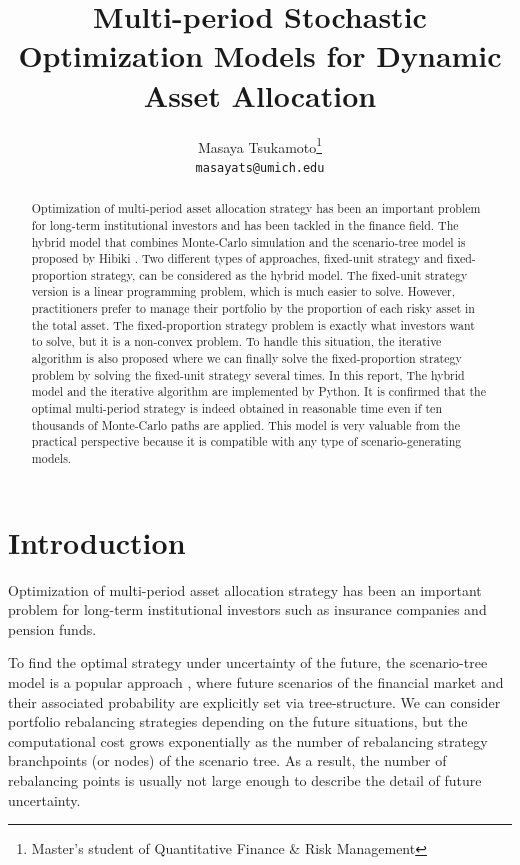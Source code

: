 \documentclass[11t]{article}
\title{\large{Multi-period Stochastic Optimization Models for Dynamic Asset Allocation}}
\author{
    Masaya Tsukamoto\thanks{Master's student of Quantitative Finance \& Risk Management} \\
    \texttt{masayats@umich.edu}
}
\date{}
\begin{document}
\maketitle

\begin{abstract}

Optimization of multi-period asset allocation strategy has been an important problem for long-term institutional investors and has been tackled in the finance field. The hybrid model that combines Monte-Carlo simulation and the scenario-tree model is proposed by Hibiki \cite{hybrid}. Two different types of approaches, fixed-unit strategy and fixed-proportion strategy, can be considered as the hybrid model. The fixed-unit strategy version is a linear programming problem, which is much easier to solve. However, practitioners prefer to manage their portfolio by the proportion of each risky asset in the total asset.  The fixed-proportion strategy problem is exactly what investors want to solve, but it is a non-convex problem. To handle this situation, the iterative algorithm is also proposed where we can finally solve the fixed-proportion strategy problem by solving the fixed-unit strategy several times. In this report, The hybrid model and the iterative algorithm are implemented by Python. It is confirmed that the optimal multi-period strategy is indeed obtained in reasonable time even if ten thousands of Monte-Carlo paths are applied. This model is very valuable from the practical perspective because it is compatible with any type of scenario-generating models.

\end{abstract}

\section{Introduction}
Optimization of multi-period asset allocation strategy has been an important problem for long-term institutional investors such as insurance companies and pension funds.

To find the optimal strategy under uncertainty of the future, the scenario-tree model is a popular approach \cite{tree},
where future scenarios of the financial market and their associated probability are explicitly set via tree-structure. 
We can consider portfolio rebalancing strategies depending on the future situations, but the computational cost grows exponentially as the number of rebalancing strategy branchpoints (or nodes) of the scenario tree.
As a result, the number of rebalancing points is usually not large enough to describe the detail of future uncertainty.
\end{document}
